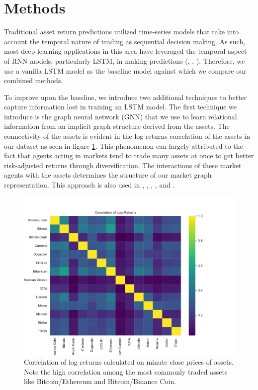 \section{Methods}

Traditional asset return predictions utilized time-series models that take into account the temporal nature of trading as sequential decision making. As such, most deep-learning applications in this area have leveraged the temporal aspect of RNN models, particularly LSTM, in making predictions (\cite{Shen2020}, \cite{Li2018}, \cite{Selvin2017}). Therefore, we use a vanilla LSTM model as the baseline model against which we compare our combined methods.

To improve upon the baseline, we introduce two additional techniques to better capture information lost in training an LSTM model. The first technique we introduce is the graph neural network (GNN) that we use to learn relational information from an implicit graph structure derived from the assets. The connectivity of the assets is evident in the log-returns correlation of the assets in our dataset as seen in figure \ref{fig:asset_corr}. This phenomenon can largely attributed to the fact that agents acting in markets tend to trade many assets at once to get better risk-adjusted returns through diversification. The interactions of these market agents with the assets determines the structure of our market graph representation. This approach is also used in \cite{Matsunaga2019}, \cite{Feng2019}, \cite{Sun2020}, \cite{Hou2021}, and \cite{Peng2021}.

\begin{figure}[H]
	\centering
	\includegraphics[width=\linewidth]{../../figures/correlation.pdf}
	\caption{Correlation of log returns calculated on minute close prices of assets. Note the high correlation among the most commonly traded assets like Bitcoin/Ethereum and Bitcoin/Binance Coin.}
	\label{fig:asset_corr}
\end{figure}

